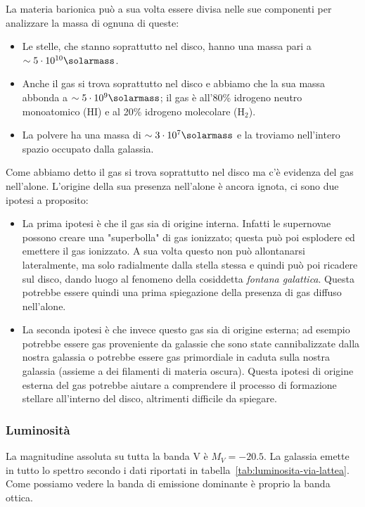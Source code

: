 La materia barionica può a sua volta essere divisa nelle sue componenti per analizzare la massa di ognuna di queste:
\begin{itemize}
    \item Le stelle, che stanno soprattutto nel disco, hanno una massa pari a $\sim 5 \cdot 10^{10} \si{\solarmass}$.
    \item Anche il gas si trova soprattutto nel disco e abbiamo che la sua massa abbonda a $\sim 5 \cdot 10^9 \si{\solarmass}$; il gas è all'80\% idrogeno neutro monoatomico (HI) e al 20\% idrogeno molecolare (H$_{2}$). 
    \item La polvere ha una massa di $\sim 3 \cdot 10^7 \si{\solarmass}$ e la troviamo nell'intero spazio occupato dalla galassia.
\end{itemize}

Come abbiamo detto il gas si trova soprattutto nel disco ma c’è evidenza del gas nell’alone. L’origine della sua presenza nell'alone è ancora ignota, ci sono due ipotesi a proposito:
\begin{itemize}
    \item La prima ipotesi è che il gas sia di origine interna. Infatti le supernovae possono creare una "superbolla" di gas ionizzato; questa può poi esplodere ed emettere il gas ionizzato. A sua volta questo non può allontanarsi lateralmente, ma solo radialmente dalla stella stessa e quindi può poi ricadere sul disco, dando luogo al fenomeno della cosiddetta \emph{fontana galattica}. Questa potrebbe essere quindi una prima spiegazione della presenza di gas diffuso nell'alone.
    \item La seconda ipotesi è che invece questo gas sia di origine esterna; ad esempio potrebbe essere gas proveniente da galassie che sono state cannibalizzate dalla nostra galassia o potrebbe essere gas primordiale in caduta sulla nostra galassia (assieme a dei filamenti di materia oscura).  Questa ipotesi di origine esterna del gas potrebbe aiutare a comprendere il processo di formazione stellare all'interno del disco, altrimenti difficile da spiegare.
\end{itemize} 

\subsubsection{Luminosità}
La magnitudine assoluta su tutta la banda V è $M_V = -20.5$. La galassia emette in tutto lo spettro secondo i dati riportati in tabella~\ref{tab:luminosita-via-lattea}. Come possiamo vedere la banda di emissione dominante è proprio la banda ottica.

